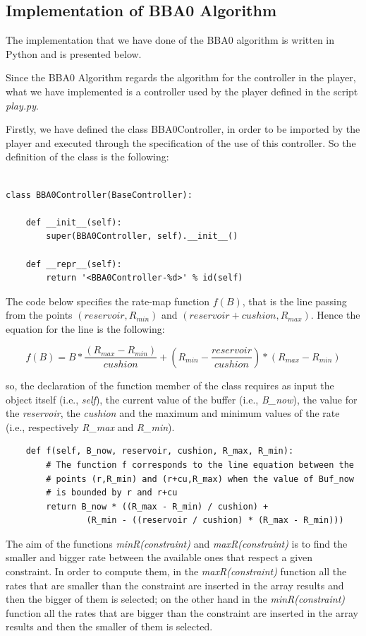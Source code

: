 \documentclass[a4paper]{report}
\begin{document}
\subsection{Implementation of BBA0 Algorithm}
The implementation that we have done of the BBA0 algorithm is written in Python and is presented below.

Since the BBA0 Algorithm regards the algorithm for the controller in the player, what we have implemented is a controller used by the player defined in the script \textit{play.py}.

Firstly, we have defined the class BBA0Controller, in order to be imported by the player and executed through the specification of the use of this controller. So the definition of the class is the following:
\begin{Verbatim}

class BBA0Controller(BaseController):

    def __init__(self):
        super(BBA0Controller, self).__init__()

    def __repr__(self):
        return '<BBA0Controller-%d>' % id(self)
\end{Verbatim}


The code below specifies the rate-map function $f(B)$, that is the line passing from the points $(reservoir, R_{min})$ and $(reservoir+cushion, R_{max})$. Hence the equation for the line is the following:

\[
f(B) = B *\frac{(R_{max} - R_{min})}{cushion} + (R_{min} - \frac{reservoir}{cushion}) * (R_{max} - R_{min})
\]

so, the declaration of the function member of the class requires as input the object itself (i.e., \textit{self}), the current value of the buffer (i.e., \textit{B\_now}), the value for the \textit{reservoir}, the \textit{cushion} and the maximum and minimum values of the rate (i.e., respectively \textit{R\_max} and \textit{R\_min}).

\begin{Verbatim}
    def f(self, B_now, reservoir, cushion, R_max, R_min):
        # The function f corresponds to the line equation between the 
        # points (r,R_min) and (r+cu,R_max) when the value of Buf_now 
        # is bounded by r and r+cu
        return B_now * ((R_max - R_min) / cushion) + 
        		(R_min - ((reservoir / cushion) * (R_max - R_min)))
\end{Verbatim}

The aim of the functions \textit{minR(constraint)} and \textit{maxR(constraint)} is to find the smaller and bigger rate between the available ones that respect a given constraint. In order to compute them, in the \textit{maxR(constraint)} function all the rates that are smaller than the constraint are inserted in the array results and then the bigger of them is selected; on the other hand in the \textit{minR(constraint)} function all the rates that are bigger than the constraint are inserted in the array results and then the smaller of them is selected.
\end{document}
